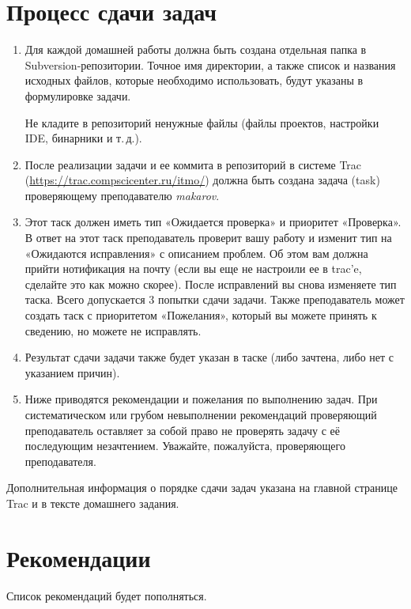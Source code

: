\documentclass[a4paper,10pt]{article}
\begin{document}
\section{Процесс сдачи задач}
    \begin{enumerate}
    \item Для каждой домашней работы должна быть создана отдельная папка в Subversion-репозитории.
        Точное имя директории, а также список и названия исходных файлов, которые необходимо использовать, будут указаны в формулировке задачи.

        Не кладите в репозиторий ненужные файлы (файлы проектов, настройки IDE,
        бинарники и т.\,д.).

    \item После реализации задачи и ее коммита в репозиторий в системе Trac
        (\url{https://trac.compscicenter.ru/itmo/}) должна быть создана
        задача (task) проверяющему преподавателю {\it makarov}.
    \item Этот таск должен иметь тип «Ожидается проверка» и приоритет «Проверка». В
        ответ на этот таск преподаватель проверит вашу работу и изменит тип на
        «Ожидаются исправления» с описанием проблем. Об этом вам должна прийти
        нотификация на почту (если вы еще не настроили ее в trac’e, сделайте это как
        можно скорее). После исправлений вы снова изменяете тип таска. Всего
        допускается 3 попытки сдачи задачи. Также преподаватель может создать таск с
        приоритетом «Пожелания», который вы можете принять к сведению, но можете не
        исправлять. 
    \item Результат сдачи задачи также будет указан в таске (либо зачтена, либо нет
        с указанием причин). 
    \item Ниже приводятся рекомендации и пожелания по выполнению задач.
        При систематическом или грубом невыполнении рекомендаций проверяющий преподаватель оставляет за собой право не проверять задачу с её последующим незачтением.
        Уважайте, пожалуйста, проверяющего преподавателя.
\end{enumerate}

Дополнительная информация о порядке сдачи задач указана на главной странице Trac и в тексте домашнего задания.

\section{Рекомендации}
Список рекомендаций будет пополняться. 
\end{document}
